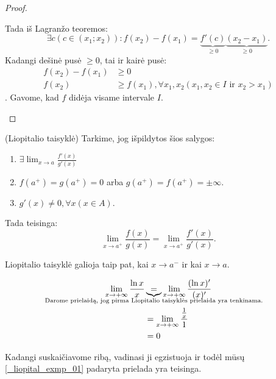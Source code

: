 \begin{prop}
\begin{proof}
\begin{description}
        Tada iš Lagranžo teoremos:
        \begin{equation*}
          \exists c (c \in (x_{1};x_{2})) : 
            f(x_{2}) - f(x_{1}) = 
            \underbrace{f'(c)}_{\geq 0}
            \underbrace{(x_{2} - x_{1})}_{\geq 0}.
        \end{equation*}
        Kadangi dešinė pusė $\geq 0$, tai ir kairė pusė:
        \begin{align*}
          f(x_{2}) - f(x_{1}) &\geq 0 \\
          f(x_{2}) &\geq f(x_{1}), \forall x_{1}, x_{2} 
            (x_{1}, x_{2} \in I \text{ ir } x_{2} > x_{1})
        \end{align*}.
        Gavome, kad $f$ didėja visame intervale $I$.

    \end{description}
  \end{proof}
\end{prop}

\begin{prop}
  (Liopitalio taisyklė) Tarkime, jog išpildytos šios salygos:
  \begin{enumerate}
    \item $\exists \lim _{x \to a} \frac{f'(x)}{g'(x)}$
    \item $f(a^{+}) = g(a^{+}) = 0$ arba 
      $g(a^{+}) = f(a^{+}) = \pm \infty$.
    \item $g'(x) \neq 0, \forall x (x \in A)$.
  \end{enumerate}

  Tada teisinga:
  \begin{equation*}
    \lim _{x \to a^{+}} \frac{f(x)}{g(x)} = 
    \lim _{x \to a^{+}} \frac{f'(x)}{g'(x)}.
  \end{equation*}
\end{prop}

\begin{note}
  Liopitalio taisyklė galioja taip pat, kai $x \to a^{-}$ ir kai 
  $x \to a$.
\end{note}

\begin{exmp}
  \begin{align}
    \lim _{x \to +\infty} \frac{\ln x}{x}
    &\underbrace{=}_{\mathclap{
      \text{Darome prielaidą, jog pirma Liopitalio taisyklės 
      prielaida yra tenkinama.}}}
    \lim _{x \to +\infty} \frac{(\ln x)'}{(x)'}
    \label{_liopital_exmp_01} \\
    &= \lim _{x \to +\infty} \frac{\frac{1}{x}}{1} \\
    &= 0
    \label{_liopital_exmp_02}
  \end{align}

  Kadangi suskaičiavome ribą, vadinasi ji egzistuoja ir todėl mūsų
  \ref{_liopital_exmp_01} padaryta prielada yra teisinga.
\end{exmp}

